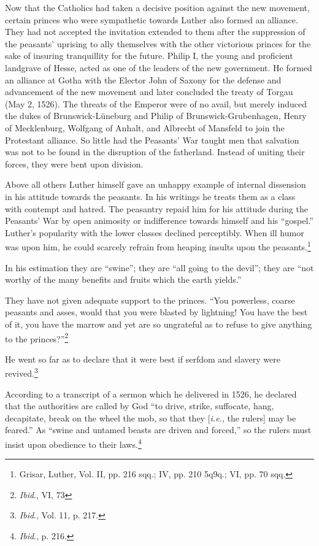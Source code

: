 Now that the Catholics had taken a decisive position against the
new movement, certain princes who were sympathetic towards
Luther also formed an alliance. They had not accepted the invitation
extended to them after the suppression of the peasants’ uprising to
ally themselves with the other victorious princes for the sake of insuring
tranquillity for the future. Philip I, the young and proficient
landgrave of Hesse, acted as one of the leaders of the new government.
He formed an alliance at Gotha with the Elector John of
Saxony for the defense and advancement of the new movement and
later concluded the treaty of Torgau (May 2, 1526). The threats of
the Emperor were of no avail, but merely induced the dukes of
Brunswick-Lüneburg and Philip of Brunswick-Grubenhagen, Henry
of Mecklenburg, Wolfgang of Anhalt, and Albrecht of Mansfeld to
join the Protestant alliance. So little had the Peasants’ War taught
men that salvation was not to be found in the disruption of the
fatherland. Instead of uniting their forces, they were bent upon
division.

Above all others Luther himself gave an unhappy example of internal dissension
in his attitude towards the peasants. In his writings
he treats them as a class with contempt and hatred. The peasantry
repaid him for his attitude during the Peasants’ War by open animosity
or indifference towards himself and his “gospel.” Luther’s
popularity with the lower classes declined perceptibly. When ill humor
was upon him, he could scarcely refrain from heaping insults upon the
peasants.\footnote
{Grisar, Luther, Vol. II, pp. 216 sqq.; IV, pp. 210 5q9q.; VI, pp. 70 sqq.}

In his estimation they are “swine”; they are “all going to the devil”; they
are “not worthy of the many benefits and fruits which the earth yields.”

They have not given adequate support to the princes. “You powerless,
coarse peasants and asses, would that you were blasted by lightning! You
have the best of it, you have the marrow and yet are so ungrateful as to
refuse to give anything to the princes?”\footnote{\textit{Ibid}., VI, 73}

He went so far as to declare that it were best if serfdom and slavery were
revived.\footnote{\textit{Ibid}., Vol. 11, p. 217.}

According to a transcript of a sermon which he delivered in 1526, he
declared that the authorities are called by God “to drive, strike, suffocate,
hang, decapitate, break on the wheel the mob, so that they [\textit{i.e.}, the rulers]
may be feared.” As “swine and untamed beasts are driven and forced,” so
the rulers must insist upon obedience to their laws.\footnote{\textit{Ibid}., p. 216.}

